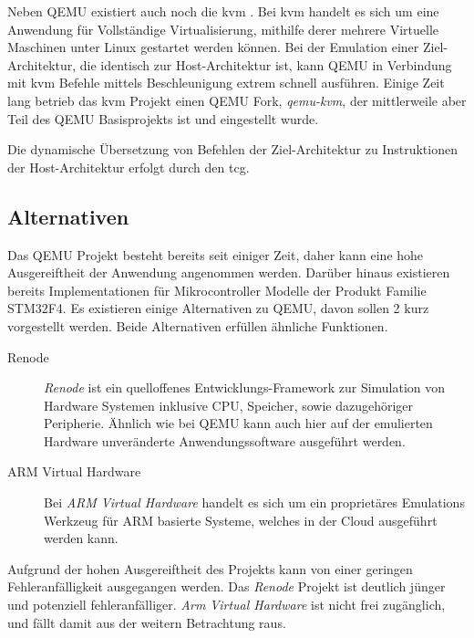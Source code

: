 Neben QEMU existiert auch noch die \ac{kvm} .
Bei \ac{kvm} handelt es sich um eine Anwendung für Vollständige
Virtualisierung, mithilfe derer mehrere Virtuelle Maschinen unter Linux
gestartet werden können.
Bei der Emulation einer Ziel-Architektur, die identisch zur Host-Architektur
ist, kann QEMU in Verbindung mit \ac{kvm} Befehle mittels Beschleunigung extrem
schnell ausführen.
Einige Zeit lang betrieb das \ac{kvm} Projekt einen QEMU Fork,
\textit{qemu-kvm}, der mittlerweile aber Teil des QEMU Basisprojekts ist und
eingestellt wurde\cite{QemuKvmWiki}.

Die dynamische Übersetzung von Befehlen der Ziel-Architektur zu Instruktionen
der Host-Architektur erfolgt durch den \ac{tcg}.

\subsection{Alternativen}

Das QEMU Projekt besteht bereits seit einiger Zeit, daher kann eine hohe
Ausgereiftheit der Anwendung angenommen werden.
Darüber hinaus existieren bereits Implementationen für Mikrocontroller Modelle
der Produkt Familie STM32F4.
Es existieren einige Alternativen zu QEMU, davon sollen 2 kurz vorgestellt
werden.
Beide Alternativen erfüllen ähnliche Funktionen.
\begin{description}
    \item[Renode]
    \textit{Renode} ist ein quelloffenes Entwicklungs-Framework zur Simulation
    von Hardware Systemen inklusive CPU, Speicher, sowie dazugehöriger
    Peripherie\cite{RenodeAbout}.
    Ähnlich wie bei QEMU kann auch hier auf der emulierten Hardware
    unveränderte Anwendungssoftware ausgeführt werden.
    \item[ARM Virtual Hardware]
    Bei \textit{ARM Virtual Hardware} handelt es sich um ein proprietäres
    Emulations Werkzeug für ARM basierte Systeme, welches in der Cloud
        ausgeführt werden kann\cite{ArmVirtualHwAbout}.
\end{description}

Aufgrund der hohen Ausgereiftheit des Projekts kann von einer geringen
Fehleranfälligkeit ausgegangen werden.
Das \textit{Renode} Projekt ist deutlich jünger und potenziell
fehleranfälliger.
\textit{Arm Virtual Hardware} ist nicht frei zugänglich, und fällt damit aus
der weitern Betrachtung raus.


